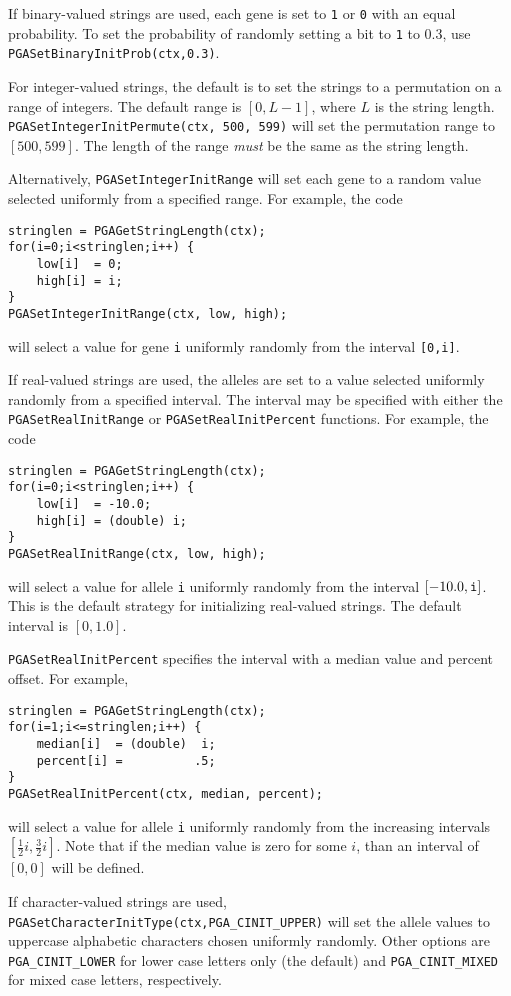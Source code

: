 \documentclass{report}
\begin{document}
If binary-valued strings are used, each gene is set to {\tt 1} or {\tt 0} with
an equal probability.  To set the probability of randomly setting a bit to
{\tt 1} to 0.3, use {\tt PGASetBinaryInitProb(ctx,0.3)}.

For integer-valued strings, the default is to set the strings to a permutation
on a range of integers.  The default range is $[0,L-1]$, where $L$ is the
string length.  {\tt PGASetIntegerInitPermute(ctx, 500, 599)} will set the
permutation range to $[500,599]$.  The length of the range {\em must} be the
same as the string length.

Alternatively, {\tt PGASetIntegerInitRange} will set each gene to a random value
selected uniformly from a specified range.  For example, the code
\begin{verbatim}
stringlen = PGAGetStringLength(ctx);
for(i=0;i<stringlen;i++) {
    low[i]  = 0;
    high[i] = i;
}
PGASetIntegerInitRange(ctx, low, high);
\end{verbatim}
will select a value for gene {\tt i} uniformly randomly from the interval
{\tt [0,i]}.

If real-valued strings are used, the alleles are set to a value selected
uniformly randomly from a specified interval.  The interval may be specified
with either the {\tt PGASetRealInitRange} or {\tt PGASetRealInitPercent}
functions.
For example, the code
\begin{verbatim}
stringlen = PGAGetStringLength(ctx);
for(i=0;i<stringlen;i++) {
    low[i]  = -10.0;
    high[i] = (double) i;
}
PGASetRealInitRange(ctx, low, high);
\end{verbatim}
will select a value for allele {\tt i} uniformly randomly from the interval
$[-10.0,{\tt i}]$.  This is the default strategy for initializing real-valued
strings.  The default interval is $[0,1.0]$.

{\tt PGASetRealInitPercent} specifies the interval with a median value and
percent offset.  For example,
\begin{verbatim}
stringlen = PGAGetStringLength(ctx);
for(i=1;i<=stringlen;i++) {
    median[i]  = (double)  i;
    percent[i] =          .5;
}
PGASetRealInitPercent(ctx, median, percent);
\end{verbatim}
will select a value for allele {\tt i} uniformly randomly from the increasing
intervals $[\frac{1}{2}i,\frac{3}{2}i]$.  Note that if 
the median value is zero for some $i$, than an 
interval of $[0,0]$ will be defined.

If character-valued strings are used,
{\tt PGASetCharacterInitType(ctx,PGA\_CINIT\_UPPER)} will set the  allele values
to uppercase alphabetic characters chosen uniformly randomly.
Other options are
{\tt PGA\_CINIT\_LOWER} for lower case letters only (the default) and 
{\tt PGA\_CINIT\_MIXED} for mixed case letters, respectively.
\end{document}
